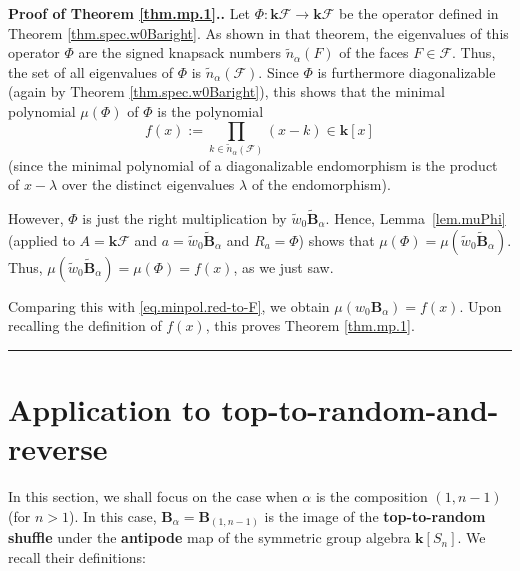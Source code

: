 \documentclass[12pt]{article}
\theoremstyle{definition}%
\theoremstyle{definition}%
\theoremstyle{remark}%
\newcommand{\tup}[1]{\left( #1 \right)}
\newcommand{\sbr}[1]{\left[ #1 \right]} %
\newcommand{\kk}{\mathbf{k}}
\newcommand{\ksn}{\kk\left[S_n\right]}
\newcommand{\kf}{\kk\mathcal{F}}
\newcommand{\BB}{\mathbf{B}}
\newcommand{\BBa}{\mathbf{B}_{\alpha}}
\newcommand{\BBta}{\widetilde{\mathbf{B}}_{\alpha}}
\newcommand{\CF}{\mathcal{F}}
\newcommand{\wo}{w_0} %
\newcommand{\wotil}{\widetilde{w}_0}
\newcommand{\nna}{\widetilde{n}_{ \alpha } }%
\newcommand{\defin}[1]{\textbf{#1}}
\newenvironment{proof}[1][Proof]{\noindent\textbf{#1.} }{\ \rule{0.5em}{0.5em}}
\begin{document}
\begin{proof}[Proof of Theorem \ref{thm.mp.1}.]
Let $\Phi:\kf\to\kf$ be the operator defined in Theorem
\ref{thm.spec.w0Baright}.
As shown in that theorem, the eigenvalues of this
operator $\Phi$ are the signed knapsack numbers
$\nna\tup{F}$ of the faces $F \in \CF$.
Thus, the set of all eigenvalues of $\Phi$ is
$\nna\tup{\CF}$.
Since $\Phi$ is furthermore diagonalizable
(again by Theorem \ref{thm.spec.w0Baright}), this shows that the
minimal polynomial $\mu\tup{\Phi}$ of $\Phi$ is the polynomial
\[
f\tup{x}  :=\prod_{k \in \nna\tup{\CF}}\tup{x-k}
\in\kk\sbr{x}
\]
(since the minimal polynomial of a diagonalizable
endomorphism is the product of $x-\lambda$ over the
distinct eigenvalues $\lambda$ of the endomorphism).

However, $\Phi$ is just the right multiplication by
$\wotil\BBta$. Hence, Lemma~\ref{lem.muPhi}
(applied to $A = \kf$ and $a = \wotil\BBta$ and $R_a = \Phi$)
shows that
$\mu\tup{\Phi} = \mu\tup{\wotil\BBta}$.
Thus,
$\mu\tup{\wotil\BBta} = \mu\tup{\Phi} = f\tup{x}$,
as we just saw.

Comparing this with \eqref{eq.minpol.red-to-F}, we obtain
$\mu\tup{\wo\BBa} = f\tup{x}$.
Upon recalling the definition of $f\tup{x}$,
this proves Theorem \ref{thm.mp.1}.
\end{proof}

\section{\label{sec.ttr}Application to top-to-random-and-reverse}

In this section, we shall focus on the case when $\alpha$ is the composition $\tup{1,n-1}$
(for $n > 1$).
In this case, $\BBa = \BB_{\tup{1, n-1}}$ is the image of the \defin{top-to-random shuffle} under the \defin{antipode} map of the symmetric group algebra $\ksn$.
We recall their definitions:
\end{document}
